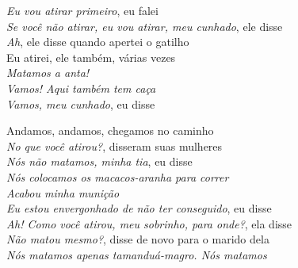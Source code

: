 \begin{linenumbers}
  \emph{Eu vou atirar primeiro}, eu falei\\
  \emph{Se você não atirar, eu vou atirar, meu cunhado}, ele disse\\
  \emph{Ah}, ele disse quando apertei o gatilho\\
  Eu atirei, ele também, várias vezes\\
  \emph{Matamos a anta!}\\
  \emph{Vamos! Aqui também tem caça}\\
  \emph{Vamos, meu cunhado}, eu disse
 
\end{linenumbers}\endgroup

\bigskip

\begin{linenumbers}\begingroup\raggedright
 
\noindent   Andamos, andamos, chegamos no caminho\\
  \emph{No que você atirou?}, disseram suas mulheres\\
  \emph{Nós não matamos, minha tia}, eu disse\\
  \emph{Nós colocamos os macacos-aranha para correr}\\
  \emph{Acabou minha munição}\\
  \emph{Eu estou envergonhado de não ter conseguido}, eu disse\\
  \emph{Ah! Como você atirou, meu sobrinho, para onde?}, ela disse\\
  \emph{Não matou mesmo?}, disse de novo para o marido dela\\
  \emph{Nós matamos apenas tamanduá-magro. Nós matamos}
 
\end{linenumbers}\endgroup

